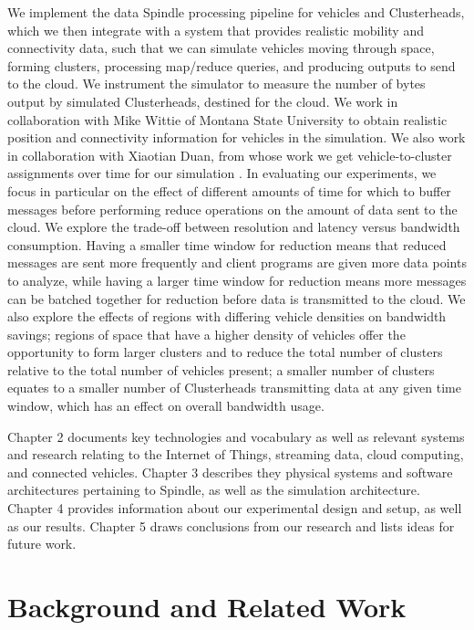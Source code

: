 \documentclass{thesis}
\begin{document}
    We implement the data Spindle processing pipeline for vehicles and Clusterheads, which we then integrate
    with a system that provides realistic mobility and connectivity data, such that we can simulate vehicles
    moving through space, forming clusters, processing map/reduce queries, and producing outputs to send to
    the cloud. We instrument the simulator to measure the number of bytes output by simulated Clusterheads,
    destined for the cloud. We work in collaboration with Mike Wittie of Montana State University to obtain
    realistic position and connectivity information for vehicles in the simulation. We also work in
    collaboration with Xiaotian Duan, from whose work we get vehicle-to-cluster assignments over time
    for our simulation \cite{xiaotian}. In evaluating our experiments, we focus in particular on the effect of different
    amounts of time for which to buffer messages before performing reduce operations
    on the amount of data sent to the cloud. We explore the trade-off
    between resolution and latency versus bandwidth consumption. Having a smaller time window for reduction means
    that reduced messages are sent more frequently and client programs are given more data points to
    analyze, while having a larger time window for reduction means more messages can be batched together for
    reduction before data is transmitted to the cloud. We also explore the effects of regions with
    differing vehicle densities on bandwidth savings; regions of space that have a higher density
    of vehicles offer the opportunity to form larger clusters and to reduce the total number
    of clusters relative to the total number of vehicles present; a smaller number of clusters
    equates to a smaller number of Clusterheads transmitting data at any given time window, which
    has an effect on overall bandwidth usage.

    Chapter 2 documents key technologies and vocabulary as well as relevant systems and research relating
    to the Internet of Things, streaming data, cloud computing, and connected vehicles. Chapter 3
    describes they physical systems and software architectures pertaining to Spindle, as well as the
    simulation architecture. Chapter 4 provides information about our experimental design and setup,
    as well as our results. Chapter 5 draws conclusions from our research and lists ideas for future
    work.

\chapter{Background and Related Work}
    \label{chap:background}
\end{document}
